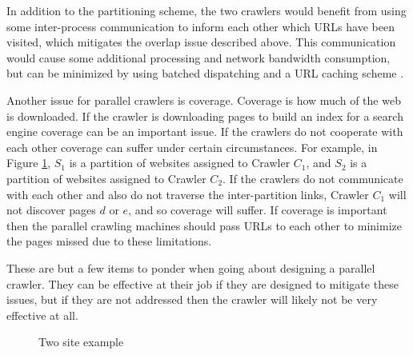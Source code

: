 In addition to the partitioning scheme, the two crawlers would benefit from using some inter-process communication to inform each other which URLs have been visited, which mitigates the overlap issue described above.  This communication would cause some additional processing and network bandwidth consumption, but can be minimized by using batched dispatching \cite{Cho:2002:PC:511446.511464} and a URL caching scheme \cite{Broder:2003:EUC:775152.775247}.

Another issue for parallel crawlers is coverage.  Coverage is how much of the web is downloaded.  If the crawler is downloading pages to build an index for a search engine coverage can be an important issue.  If the crawlers do not cooperate with each other coverage can suffer under certain circumstances.  For example, in Figure \ref{fig:cproc}, \(S_1\) is a partition of websites assigned to Crawler \(C_1\), and \(S_2\) is a partition of websites assigned to Crawler \(C_2\).  If the crawlers do not communicate with each other and also do not traverse the inter-partition links, Crawler \(C_1\) will not discover pages \(d\) or \(e\), and so coverage will suffer.  If coverage is important then the parallel crawling machines should pass URLs to each other to minimize the pages missed due to these limitations.

These are but a few items to ponder when going about designing a parallel crawler.  They can be effective at their job if they are designed to mitigate these issues, but if they are not addressed then the crawler will likely not be very effective at all.

\clearpage

\begin{figure}[h!]
\centering
\label{fig:cproc}
\caption[Two site example]{Two site example\protect\footnotemark}
\end{figure}

